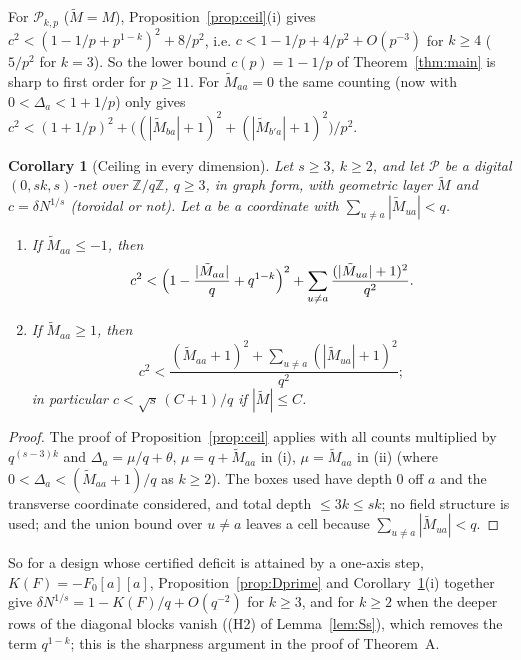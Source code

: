 \documentclass[11pt]{amsart}
\newtheorem{corollary}[theorem]{Corollary}
\theoremstyle{definition}
\theoremstyle{plain}
\newcommand{\Z}{\mathbb{Z}}
\begin{document}
For $\mathcal P_{k,p}$ ($\tilde M=M$), Proposition~\ref{prop:ceil}(i) gives $c^2<(1-1/p+p^{1-k})^2+8/p^2$, i.e. $c<1-1/p+4/p^2+O(p^{-3})$ for $k\ge4$ ($5/p^2$ for $k=3$). So the lower bound $c(p)=1-1/p$ of Theorem~\ref{thm:main} is sharp to first order for $p\ge11$. For $\tilde M_{aa}=0$ the same counting (now with $0<\Delta_a<1+1/p$) only gives $c^2<(1+1/p)^2+\bigl((|\tilde M_{ba}|+1)^2+(|\tilde M_{b'a}|+1)^2\bigr)/p^2$.

\begin{corollary}[Ceiling in every dimension]\label{cor:ceils}
Let $s\ge3$, $k\ge2$, and let $\mathcal P$ be a digital $(0,sk,s)$-net over $\Z/q\Z$, $q\ge3$, in graph form, with geometric layer $\tilde M$ and $c=\delta N^{1/s}$ (toroidal or not). Let $a$ be a coordinate with $\sum_{u\ne a}|\tilde M_{ua}|<q$.
\begin{enumerate}
\item[(i)] If $\tilde M_{aa}\le-1$, then
\[
c^2<\Bigl(1-\frac{|\tilde M_{aa}|}q+q^{1-k}\Bigr)^2+\sum_{u\ne a}\frac{(|\tilde M_{ua}|+1)^2}{q^2}.
\]
\item[(ii)] If $\tilde M_{aa}\ge1$, then
\[
c^2<\frac{(\tilde M_{aa}+1)^2+\sum_{u\ne a}(|\tilde M_{ua}|+1)^2}{q^2};
\]
in particular $c<\sqrt s\,(C+1)/q$ if $|\tilde M|\le C$.
\end{enumerate}
\end{corollary}

\begin{proof}
The proof of Proposition~\ref{prop:ceil} applies with all counts multiplied by $q^{(s-3)k}$ and $\Delta_a=\mu/q+\theta$, $\mu=q+\tilde M_{aa}$ in (i), $\mu=\tilde M_{aa}$ in (ii) (where $0<\Delta_a<(\tilde M_{aa}+1)/q$ as $k\ge2$). The boxes used have depth $0$ off $a$ and the transverse coordinate considered, and total depth $\le3k\le sk$; no field structure is used; and the union bound over $u\ne a$ leaves a cell because $\sum_{u\ne a}|\tilde M_{ua}|<q$.
\end{proof}

So for a design whose certified deficit is attained by a one-axis step, $K(F)=-F_0[a][a]$, Proposition~\ref{prop:Dprime} and Corollary~\ref{cor:ceils}(i) together give $\delta N^{1/s}=1-K(F)/q+O(q^{-2})$ for $k\ge3$, and for $k\ge2$ when the deeper rows of the diagonal blocks vanish ((H2) of Lemma~\ref{lem:Ss}), which removes the term $q^{1-k}$; this is the sharpness argument in the proof of Theorem~A.
\end{document}
